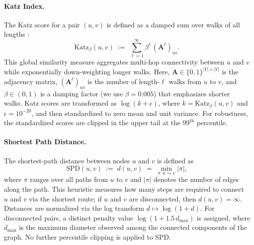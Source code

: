 \documentclass{article}
\theoremstyle{plain}
\theoremstyle{definition}
\theoremstyle{remark}
\begin{document}
\paragraph{Katz Index.}
The Katz score for a pair \((u,v)\) is defined as a damped sum over walks of all lengths \cite{katz_new_1953}:
\begin{equation}
\mathrm{Katz}_{\beta}(u,v) \;:=\; \sum_{\ell=1}^{\infty} \beta^{\ell}\,(\mathbf{A}^{\ell})_{uv}.
\end{equation}
This global similarity measure aggregates multi-hop connectivity between \(u\) and \(v\) while exponentially down-weighting longer walks. Here, \(\mathbf{A}\in\{0,1\}^{|V|\times |V|}\) is the adjacency matrix, \((\mathbf{A}^{\ell})_{uv}\) is the number of length-\(\ell\) walks from \(u\) to \(v\), and \(\beta\in(0,1)\) is a damping factor (we use \(\beta=0.005\)) that emphasizes shorter walks. Katz scores are transformed as \(\log(k+\epsilon)\), where \(k=\mathrm{Katz}_{\beta}(u,v)\) and \(\epsilon=10^{-20}\), and then standardized to zero mean and unit variance. For robustness, the standardized scores are clipped in the upper tail at the \(99^{\text{th}}\) percentile.

\paragraph{Shortest Path Distance.}
The shortest-path distance between nodes \(u\) and \(v\) is defined as
\begin{equation}
\mathrm{SPD}(u,v) \;:=\; d(u,v) \;=\; \min_{\pi:u\rightsquigarrow v} |\pi|,
\end{equation}
where \(\pi\) ranges over all paths from \(u\) to \(v\) and \(|\pi|\) denotes the number of edges along the path. This heuristic measures how many steps are required to connect \(u\) and \(v\) via the shortest route; if \(u\) and \(v\) are disconnected, then \(d(u,v)=\infty\). Distances are normalized via the log transform \(d \mapsto \log(1+d)\). For disconnected pairs, a distinct penalty value \(\log(1+1.5\,d_{\max})\) is assigned, where \(d_{\max}\) is the maximum diameter observed among the connected components of the graph. No further percentile clipping is applied to SPD.
\end{document}
